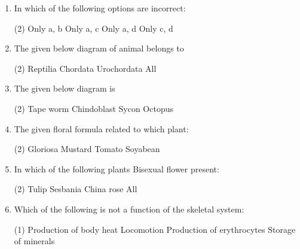 \documentclass[twocolumn]{article}
\begin{document}
\begin{enumerate}
    \item In which of the following options are incorrect:
    \begin{tasks}(2)
        \task Only a, b
        \task Only a, c
        \task Only a, d
        \task Only c, d
    \end{tasks}
    
    \item The given below diagram of animal belongs to
    \begin{tasks}(2)
        \task Reptilia
        \task Chordata
        \task Urochordata
        \task All
    \end{tasks}
    \begin{center}
    \end{center}
    
    \item The given below diagram is
    \begin{tasks}(2)
        \task Tape worm
        \task Chindoblast
        \task Sycon
        \task Octopus
    \end{tasks}
    \begin{center}
    \end{center}

    \item The given floral formula related to which plant:
    \begin{tasks}(2)
        \task Gloriosa
        \task Mustard
        \task Tomato
        \task Soyabean
    \end{tasks}
    
    \item In which of the following plants Bisexual flower present:
    \begin{tasks}(2)
        \task Tulip
        \task Sesbania
        \task China rose
        \task All
    \end{tasks}
    
    \item Which of the following is not a function of the skeletal system:
    \begin{tasks}(1)
        \task Production of body heat
        \task Locomotion
        \task Production of erythrocytes
        \task Storage of minerals
    \end{tasks}
    

\end{enumerate}
\end{document}
